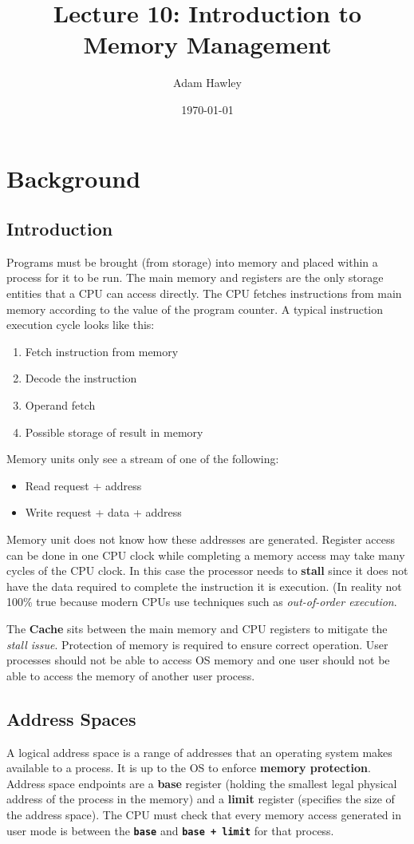 \documentclass[11pt]{article}
\author{Adam Hawley}
\date{\today}
\title{Lecture 10: Introduction to Memory Management}
\begin{document}
\maketitle
\tableofcontents


\section{Background}
\label{sec:orga76f10a}
\subsection{Introduction}
\label{sec:org78ddd86}
Programs must be brought (from storage) into memory and placed within a process for it to be run.
The main memory and registers are the only storage entities that a CPU can access directly.
The CPU fetches instructions from main memory according to the value of the program counter.
A typical instruction execution cycle looks like this:
\begin{enumerate}
\item Fetch instruction from memory
\item Decode the instruction
\item Operand fetch
\item Possible storage of result in memory
\end{enumerate}

Memory units only see a stream of one of the following:
\begin{itemize}
\item Read request + address
\item Write request + data + address
\end{itemize}
Memory unit does not know how these addresses are generated.
Register access can be done in one CPU clock while completing a memory access may take many cycles of the CPU clock.
In this case the processor needs to \textbf{stall} since it does not have the data required to complete the instruction it is execution.
(In reality not 100\% true because modern CPUs use techniques such as \emph{out-of-order execution}.

The \textbf{Cache} sits between the main memory and CPU registers to mitigate the \emph{stall issue}.
Protection of memory is required to ensure correct operation.
User processes should not be able to access OS memory and one user should not be able to access the memory of another user process.

\subsection{Address Spaces}
\label{sec:org3535c17}
A logical address space is a range of addresses that an operating system makes available to a process.
It is up to the OS to enforce \textbf{memory protection}.
Address space endpoints are a \textbf{base} register (holding the smallest legal physical address of the process in the memory) and a \textbf{limit} register (specifies the size of the address space).
The CPU must check that every memory access generated in user mode is between the \textbf{\texttt{base}} and \textbf{\texttt{base + limit}} for that process.
\end{document}
